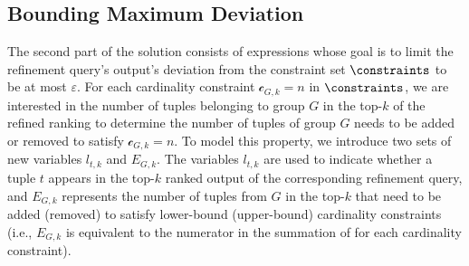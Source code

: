 
\subsection{Bounding Maximum Deviation}

The second part of the solution consists of expressions whose goal is to limit the refinement query's output's deviation from the constraint set $\constraints$ to be at most $\varepsilon$. For each cardinality constraint $\mathscr{c}_{G, k} = n$ in $\constraints$, we are interested in the number of tuples belonging to group $G$ in the top-$k$ of the refined ranking to determine the number of tuples of group $G$ needs to be added or removed to satisfy $\mathscr{c}_{G, k} = n$.
To model this property, we introduce two sets of new variables $l_{t, k}$ and $E_{G, k}$. The variables $l_{t, k}$ are used to indicate whether a tuple $t$ appears in the top-$k$ ranked output of the corresponding refinement query, and $E_{G, k}$ represents the number of tuples from $G$ in the top-$k$ that need to be added (removed) to satisfy lower-bound (upper-bound) cardinality constraints (i.e., $E_{G, k}$ is equivalent to the numerator in the summation of  for each cardinality constraint).  

